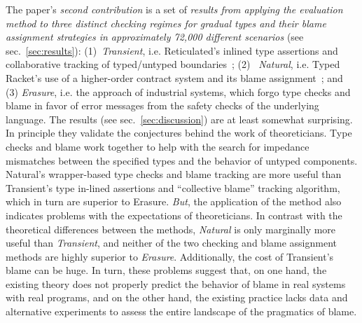 The paper's {\it second contribution\/} is a set of {\em results from
applying the evaluation method to three distinct checking regimes for
gradual types and their blame assignment
strategies in approximately 72,000 different scenarios\/} (see
sec.~\ref{sec:results}): (1)~{\it Transient\/}, i.e. Reticulated's
inlined type assertions and collaborative tracking of typed/untyped boundaries~\citep{vss-popl-2017}; (2)~{\it
Natural\/}, i.e. Typed Racket's use of a higher-order contract system and
its blame assignment~\citep{ff-icfp-2002}; and (3) {\it Erasure\/}, i.e.
the approach of industrial systems, which forgo type checks and blame in favor of error
messages from the safety checks of the underlying language. The results
(see sec.~\ref{sec:discussion}) are at least somewhat surprising.  In
principle they validate the conjectures behind the work of theoreticians.
Type checks and blame work together to help with the search for
impedance mismatches between the specified types and the behavior of
untyped components.  Natural's wrapper-based type checks and blame tracking are
more useful than Transient's type in-lined assertions and ``collective blame'' tracking algorithm,
which in turn are superior to Erasure. {\em But\/}, the application of the
method also indicates problems with the expectations of theoreticians. 
In contrast with the theoretical differences between the methods,
{\it Natural\/} is only marginally more useful than {\it Transient\/}, and neither of the two
checking and blame assignment methods are highly superior to {\it Erasure\/}. Additionally, 
the cost of Transient's blame can be huge.  In turn, these
problems suggest that, on one hand, the existing theory does not properly
predict the behavior of blame in real systems with real programs,
and on the other hand, the existing practice lacks data and alternative
experiments to assess the entire landscape of the pragmatics of blame. 
